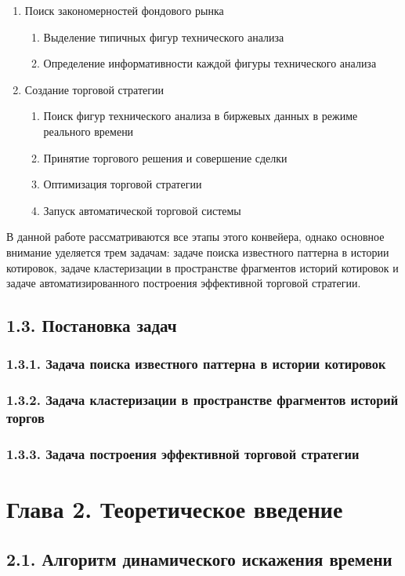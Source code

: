 \documentclass[12pt]{article}
\begin{document}
\begin{enumerate}
\item Поиск закономерностей фондового рынка
\begin{enumerate}
\item Выделение типичных фигур технического анализа
\item Определение информативности каждой фигуры технического анализа
\end{enumerate}
\item Создание торговой стратегии
\begin{enumerate}
\item Поиск фигур технического анализа в биржевых данных в режиме реального времени
\item Принятие торгового решения и совершение сделки
\item Оптимизация торговой стратегии
\item Запуск автоматической торговой системы
\end{enumerate}
\end{enumerate}

В данной работе рассматриваются все этапы этого конвейера, однако основное внимание уделяется трем задачам: задаче поиска известного паттерна в истории котировок, задаче кластеризации в пространстве фрагментов историй котировок и задаче автоматизированного построения эффективной торговой стратегии.
\subsection{1.3. Постановка задач}
\subsubsection{1.3.1. Задача поиска известного паттерна в истории котировок}
\subsubsection{1.3.2. Задача кластеризации в пространстве фрагментов историй торгов}
\subsubsection{1.3.3. Задача построения эффективной торговой стратегии}
\section{Глава 2. Теоретическое введение}
\subsection{2.1. Алгоритм динамического искажения времени}
\end{document}
